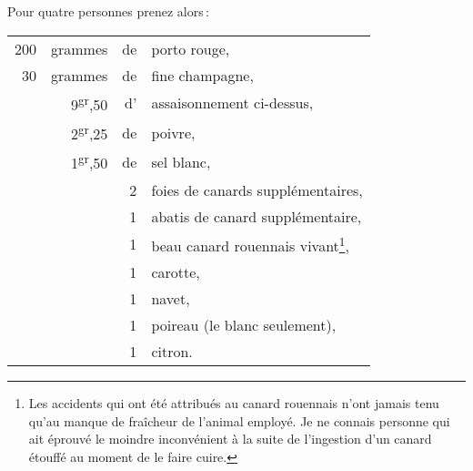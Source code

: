 Pour quatre personnes prenez alors :

\medskip

\footnotesize
\begin{longtable}{rrrp{16em}}
    200 & grammes                    & de & porto rouge,                                                  \\
     30 & grammes                    & de & fine champagne,                                               \\
        & 9\textsuperscript{gr},50   & d' & assaisonnement ci-dessus,                                     \\
        & 2\textsuperscript{gr},25   & de & poivre,                                                       \\
        & 1\textsuperscript{gr},50   & de & sel blanc,                                                    \\
        &                            &  2 & foies de canards supplémentaires,                             \\
        &                            &  1 & abatis de canard supplémentaire,                              \\
        &                            &  1 & beau canard rouennais vivant\footnote{Les accidents
                                                  qui ont été attribués au canard rouennais n'ont
                                                  jamais tenu qu'au manque de fraîcheur de l'animal
                                                  employé. Je ne connais personne qui ait éprouvé
                                                  le moindre inconvénient à la suite de l'ingestion
                                                  d'un canard étouffé au moment de le faire cuire.},      \\
        &                            &  1 & carotte,                                                      \\
        &                            &  1 & navet,                                                        \\
        &                            &  1 & poireau (le blanc seulement),                                 \\
        &                            &  1 & citron.                                                       \\
\end{longtable}
\normalsize

